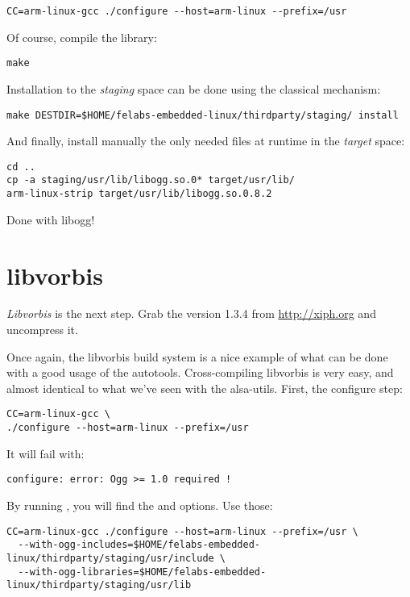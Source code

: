 \begin{verbatim}
CC=arm-linux-gcc ./configure --host=arm-linux --prefix=/usr
\end{verbatim}

Of course, compile the library:

\begin{verbatim}
make
\end{verbatim}

Installation to the {\em staging} space can be done using the
classical  mechanism:

\begin{verbatim}
make DESTDIR=$HOME/felabs-embedded-linux/thirdparty/staging/ install
\end{verbatim}

And finally, install manually the only needed files at runtime in the
{\em target} space:

\begin{verbatim}
cd ..
cp -a staging/usr/lib/libogg.so.0* target/usr/lib/
arm-linux-strip target/usr/lib/libogg.so.0.8.2
\end{verbatim}

Done with libogg!

\section{libvorbis}

{\em Libvorbis} is the next step. Grab the version 1.3.4 from
\url{http://xiph.org} and uncompress it.

Once again, the libvorbis build system is a nice example of what can
be done with a good usage of the autotools. Cross-compiling libvorbis
is very easy, and almost identical to what we've seen with the
alsa-utils. First, the configure step:

\begin{verbatim}
CC=arm-linux-gcc \
./configure --host=arm-linux --prefix=/usr
\end{verbatim}

It will fail with:

\begin{verbatim}
configure: error: Ogg >= 1.0 required !
\end{verbatim}

By running , you will find the
 and  options.
Use those:

\begin{verbatim}
CC=arm-linux-gcc ./configure --host=arm-linux --prefix=/usr \
  --with-ogg-includes=$HOME/felabs-embedded-linux/thirdparty/staging/usr/include \
  --with-ogg-libraries=$HOME/felabs-embedded-linux/thirdparty/staging/usr/lib
\end{verbatim}

